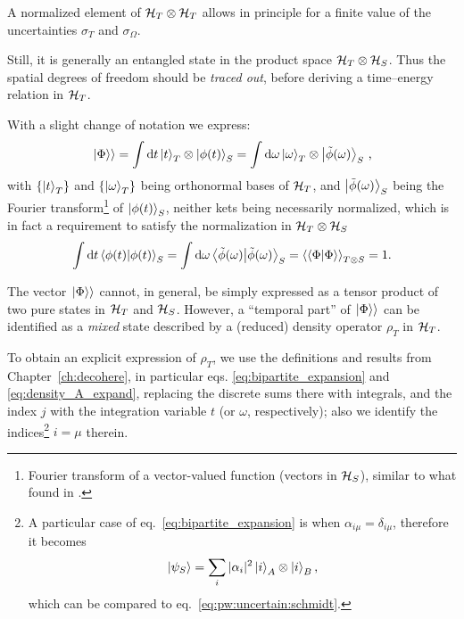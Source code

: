 A normalized element of $\mathcal{H}_T \otimes \mathcal{H}_T$ allows in principle for a finite value
of the uncertainties $\sigma_{T}$ and $\sigma_{\Omega}$.

Still, it is generally an entangled state in the product space $\mathcal{H}_T \otimes \mathcal{H}_S$.
Thus the spatial degrees of freedom should be \emph{traced out},
before deriving a time--energy relation in $\mathcal{H}_T$.

With a slight change of notation we express:
\begin{equation}\label{eq:pw:uncertain:schmidt}
  \left.\left| \Phi \right\rangle\right\rangle =
    \int \dd{t} \ket{t}_T \otimes \ket{\phi(t)}_S =
    \int \dd\omega \ket{\omega}_T \otimes \ket{\tilde{\phi}(\omega)}_S \, \text{,}
\end{equation}
with
$\left\{\ket{t}_T\right\}$ and $\left\{\ket{\omega}_T\right\}$
being
orthonormal bases of $\mathcal{H}_T$,
and
$\ket{\tilde{\phi}(\omega)}_S$ being the Fourier transform\footnote{
  Fourier transform of a
  vector-valued function
  (vectors in $\mathcal{H}_S$),
  similar to what found in \cite{Maccone:Pauli}.
}
of $\ket{\phi(t)}_S$,
neither kets being necessarily normalized, which is in fact a requirement
to satisfy the normalization in $\mathcal{H}_T \otimes \mathcal{H}_S$
\[
  \int \dd{t} \braket{\phi(t)}_S =
    \int \dd{\omega} \braket{\tilde{\phi}(\omega)}_S =
    \left\langle\left\langle \Phi \middle| \Phi \right\rangle\right\rangle_{T \otimes S} =
    1
    \text{.}
\]

The vector $\left.\left| \Phi \right\rangle\right\rangle$
cannot,
in general, be simply expressed as a tensor product of two pure states
in $\mathcal{H}_T$ and $\mathcal{H}_S$.
However,
a ``temporal part'' of $\left.\left| \Phi \right\rangle\right\rangle$
can be identified as a \emph{mixed} state described
by a (reduced) density operator $\rho_T$ in $\mathcal{H}_T$.

To obtain an explicit expression of $\rho_T$,
we use the definitions and results from Chapter~\ref{ch:decohere},
in particular eqs. \eqref{eq:bipartite_expansion} and \eqref{eq:density_A_expand},
replacing the discrete sums there with integrals,
and the index $j$ with the integration variable $t$ (or $\omega$, respectively);
also we identify the indices\footnote{
  A particular case of eq.~\eqref{eq:bipartite_expansion} is when $\alpha_{i\mu} = \delta_{i\mu}$,
  therefore it becomes
  $$\ket{\psi_S} = \sum_{i} |\alpha_{i}|^{2} \ket{i}_A \otimes \ket{i}_B \text{,}$$
  which can be compared to eq.~\eqref{eq:pw:uncertain:schmidt}.
}
$i = \mu$ therein.

